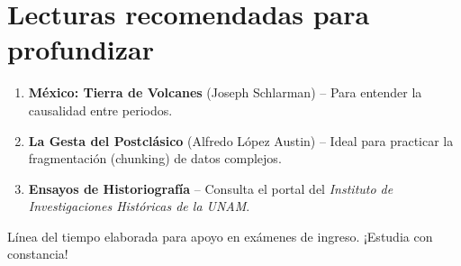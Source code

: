 \documentclass[12pt,a4paper]{article}
\begin{document}
\vspace{0.5cm}
\section*{Lecturas recomendadas para profundizar}
\begin{tcolorbox}[colframe=red!50!black, colback=white, title=Análisis Histórico]
    \begin{enumerate}
        \item \textbf{México: Tierra de Volcanes} (Joseph Schlarman) – Para entender la causalidad entre periodos.
        \item \textbf{La Gesta del Postclásico} (Alfredo López Austin) – Ideal para practicar la fragmentación (chunking) de datos complejos.
        \item \textbf{Ensayos de Historiografía} – Consulta el portal del \textit{Instituto de Investigaciones Históricas de la UNAM}.
    \end{enumerate}
\end{tcolorbox}

\vfill
\begin{center}
    \small{Línea del tiempo elaborada para apoyo en exámenes de ingreso. ¡Estudia con constancia!}
\end{center}
\end{document}
